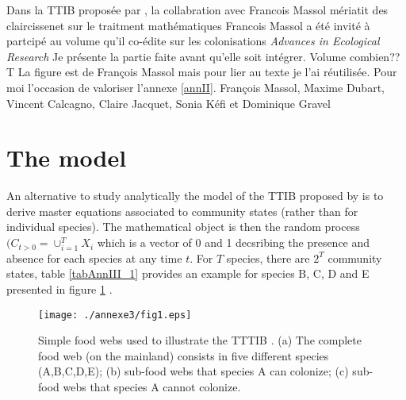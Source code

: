 \label{annIII}
\addtocounter{chapter}{1}
\setcounter{equation}{0}

Dans la TTIB proposée par \cite{Gravel2011}, la collabration avec Francois Massol
mériatit des claircissenet sur le traitment mathématiques
Francois Massol a été invité à partcipé au volume qu'il co-édite sur les colonisations \emph{Advances in Ecological Research}
Je présente la partie faite avant qu'elle soit intégrer. Volume combien??T
La figure est de François Massol mais pour lier au texte je l'ai réutilisée.
Pour moi l'occasion de valoriser l'annexe \ref{annII}.
François Massol, Maxime Dubart, Vincent Calcagno, Claire Jacquet, Sonia Kéfi et Dominique Gravel


\section{The model}\label{the-model}

An alternative to study analytically the model of the TTIB proposed by \cite{Gravel2011} is to derive
master equations associated to community states (rather than for individual species).
The mathematical object is then the random process
$(C_{t>0}=\cup_{i=1}^TX_i$ which is a vector of 0 and 1 decsribing
the presence and absence for each species at any time \(t\). For \(T\)
species, there are \(2^T\) community states, table \ref{tabAnnIII_1} provides an example
for species B, C, D and E presented in figure \ref{ann3fig1} .

\begin{figure}[h!]
\centering
\texttt{[image: ./annexe3/fig1.eps]}
\caption[Simple food webs illustrting the TTTIB]{Simple food webs used to illustrate the TTTIB \cite{Gravel2011}.
 (a) The complete food web (on the mainland) consists in five different species (A,B,C,D,E);
 (b) sub-food webs that species A can colonize; (c) sub-food webs that species A cannot colonize.
}
\label{ann3fig1}
\end{figure}


